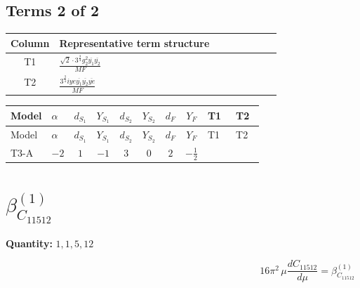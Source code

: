 \documentclass[8pt]{article}
\begin{document}
\begin{landscape}
\subsection*{Terms 2 of 2}
\begin{center}
\begin{tabular}{@{}c >{\raggedright\arraybackslash}p{0.82\linewidth}@{}}
\toprule
Column & Representative term structure \\
\midrule
T1 & \(\displaystyle \frac{\sqrt{2} \cdot 3^{\frac{3}{4}} g_{2}^{2} \overline{y_{1}} \overline{y_{2}}}{MF}\) \\
\midrule
T2 & \(\displaystyle \frac{3^{\frac{3}{4}} i ye \overline{y_{1}} \overline{y_{2}} \overline{ye}}{MF}\) \\
\midrule
\bottomrule
\end{tabular}
\end{center}
\smallskip
\tiny
\begin{longtable}{@{}llcccccc >{\raggedright\arraybackslash}p{0.21\linewidth} >{\raggedright\arraybackslash}p{0.21\linewidth}@{}}
\toprule
Model & $\alpha$ & $d_{S_1}$ & $Y_{S_1}$ & $d_{S_2}$ & $Y_{S_2}$ & $d_F$ & $Y_F$ & T1 & T2 \\
\midrule
\endfirsthead
\toprule
Model & $\alpha$ & $d_{S_1}$ & $Y_{S_1}$ & $d_{S_2}$ & $Y_{S_2}$ & $d_F$ & $Y_F$ & T1 & T2 \\
\midrule
\endhead
T3-A & $-2$ & $1$ & $-1$ & $3$ & $0$ & $2$ & $-\frac{1}{2}$ & \scriptsize\adjustbox{max width=\linewidth}{$\begin{gathered} \frac{\sqrt{2} \cdot 3^{\frac{3}{4}} g_{2}^{2} \overline{y_{1}} \overline{y_{2}}}{3 MF}\end{gathered}$} & \scriptsize\adjustbox{max width=\linewidth}{$\begin{gathered} \frac{3^{\frac{3}{4}} i ye \overline{y_{1}} \overline{y_{2}} \overline{ye}}{12 MF}\end{gathered}$} \\
\midrule
\bottomrule
\end{longtable}
\clearpage
\section*{$\beta_{C_{11512}}^{(1)}$}
\noindent\textbf{Quantity: }$\mathrm{1,1,5,12}$\par\smallskip
\[16\pi^2\,\mu\frac{d C_{11512}}{d\mu}=\beta_{C_{11512}}^{(1)}\]

\end{landscape}
\end{document}
